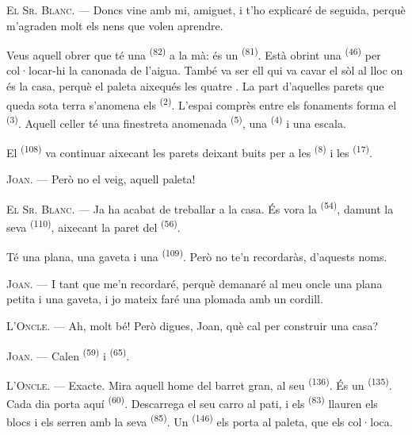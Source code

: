 \VUsaut{3.0mm}

\textsc{El Sr. Blanc}. --- Doncs vine amb mi, amiguet, i t'ho explicaré de seguida, perquè
m'agraden molt els nens que volen aprendre.

Veus aquell obrer que té una  \textsuperscript{(82)} a la mà: és un
 \textsuperscript{(81)}. Està obrint una 
\textsuperscript{(46)} per col·locar-hi la canonada de l'aigua. També va ser ell qui va cavar
el sòl al lloc on és la casa, perquè el paleta aixequés les quatre
. La part d'aquelles parets que queda sota terra s'anomena els
 \textsuperscript{(2)}. L'espai comprès entre els fonaments
forma el  \textsuperscript{(3)}. Aquell celler té una finestreta anomenada
 \textsuperscript{(5)}, una  \textsuperscript{(4)} i una
escala.

El  \textsuperscript{(108)} va continuar aixecant les parets deixant buits per
a les  \textsuperscript{(8)} i les  \textsuperscript{(17)}.

\textsc{Joan}. --- Però no el veig, aquell paleta!

\textsc{El Sr. Blanc}. --- Ja ha acabat de treballar a la casa. És vora la
 \textsuperscript{(54)}, damunt la seva 
\textsuperscript{(110)}, aixecant la paret del  \textsuperscript{(56)}.

Té una plana, una gaveta i una  \textsuperscript{(109)}. Però no te'n
recordaràs, d'aquests noms.

\textsc{Joan}. --- I tant que me'n recordaré, perquè demanaré al meu oncle una plana petita i
una gaveta, i jo mateix faré una plomada amb un cordill.

\VUsaut{3.0mm}
\VUsaut{3.0mm}

\textsc{L'Oncle}. --- Ah, molt bé! Però digues, Joan, què cal per construir una casa?

\textsc{Joan}. --- Calen  \textsuperscript{(59)} i 
\textsuperscript{(65)}.

\textsc{L'Oncle}. --- Exacte. Mira aquell home del barret gran, al seu
 \textsuperscript{(136)}. És un 
\textsuperscript{(135)}. Cada dia porta aquí  \textsuperscript{(60)}.
Descarrega el seu carro al pati, i els  \textsuperscript{(83)} llauren els
blocs i els serren amb la seva  \textsuperscript{(85)}. Un
 \textsuperscript{(146)} els porta al paleta, que els col·loca.

